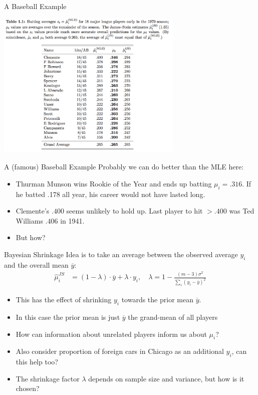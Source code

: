 \documentclass[aspectratio=169]{beamer}
\begin{document}
\begin{frame}[fragile]{A Baseball Example}
\begin{center}
\includegraphics[width=3.5in]{./resources/baseball.png}
\end{center}
\end{frame}

\begin{frame}[fragile]{A (famous) Baseball Example}
Probably we can do better than the MLE here:
\begin{itemize}
\item Thurman Munson wins Rookie of the Year and ends up batting $\mu_i = .316$. If he batted .178 all year, his career would not have lasted long.
\item Clemente's $.400$ seems unlikely to hold up. Last player to hit $> .400$ was Ted Williams $.406$ in 1941.
\item But how?
\end{itemize}
\end{frame}

\begin{frame}[fragile]{Bayesian Shrinkage}
Idea is to take an average between the observed average $y_i$ and the overall mean $\overline{y}$:
\begin{align*}
\widehat{\mu}_i^{JS} &=  (1-\lambda) \cdot \overline{y}  + \lambda \cdot y_i, \quad
\lambda = 1 - \frac{(m-3) \sigma^2}{\sum_i( y_i - \overline{y})^2}
\end{align*}
\begin{itemize}
\item This has the effect of \alert{shrinking} $y_i$ towards the \alert{prior mean} $\overline{y}$.
\item In this case the \alert{prior mean} is just $\overline{y}$ the grand-mean of all players
\item How can information about unrelated players inform us about $\mu_i$?
\item Also consider proportion of foreign cars in Chicago as an additional $y_i$, can this help too?
\item The \alert{shrinkage factor} $\lambda$ depends on sample size and variance, but how is it chosen?
\end{itemize}
\end{frame}
\end{document}
